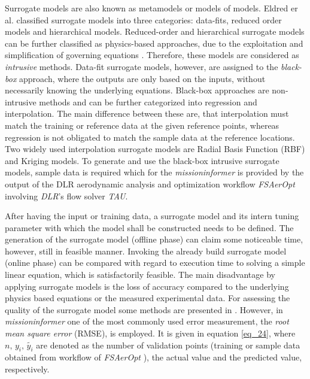 Surrogate models are also known as metamodels or models of models.
Eldred er al. \cite{eldred_second-order_2004}
classified surrogate models 
into three categories: data-fits, reduced order models
 and hierarchical models. 
Reduced-order and hierarchical surrogate models can be 
further classified as physics-based approaches, due to the 
exploitation and simplification of 
governing equations \cite{ahmed_surrogate-based_2009}. Therefore,
these models are considered as \emph{intrusive} methods. 
Data-fit surrogate models, however, are assigned to 
the \emph{black-box} approach, where the outputs
are only based on the inputs, without necessarily 
knowing the underlying equations. Black-box approaches 
are non-intrusive methods and can be further categorized 
into regression and interpolation. The main difference between 
these are, that interpolation must match the training or 
reference data at the given reference points, whereas 
regression is not obligated to match the sample data at 
the reference locations. Two widely 
used interpolation surrogate models are Radial Basis Function (RBF)
and Kriging models. To generate and use 
the black-box intrusive surrogate models, sample data is required which 
for the \emph{missioninformer} is provided by the output of the DLR 
aerodynamic analysis and optimization workflow 
\emph{FSAerOpt} \cite{merle_high-fidelity_2019} involving 
\emph{DLR}'s flow solver \emph{TAU}.\newline

After having the input or training data,
 a surrogate model and its 
intern tuning parameter with 
which the model shall be constructed needs to be defined.
 The generation 
of the surrogate model (offline phase) can claim some noticeable time, 
however, still in feasible manner. Invoking the 
already build surrogate model (online phase) can 
be compared with regard to execution time to
solving a simple linear equation, which is 
satisfactorily feasible. The main disadvantage 
by applying surrogate models 
is the loss of accuracy compared 
to the underlying physics based equations or 
the measured experimental data. For 
assessing the quality of the surrogate model 
some methods are presented in \cite{meckesheimer_computationally_2002}.
However, in \emph{missioninformer} one of the most commonly 
used error measurement, the \emph{root mean square error} (RMSE),
is employed. It is given in equation \eqref{eq_24}, where 
$n, \,y_i, \, \tilde{y_i}$ are denoted as the number of 
validation points (training or sample data obtained 
from workflow of \emph{FSAerOpt} \cite{merle_high-fidelity_2019}), 
the actual value and the predicted value, respectively. \newline



